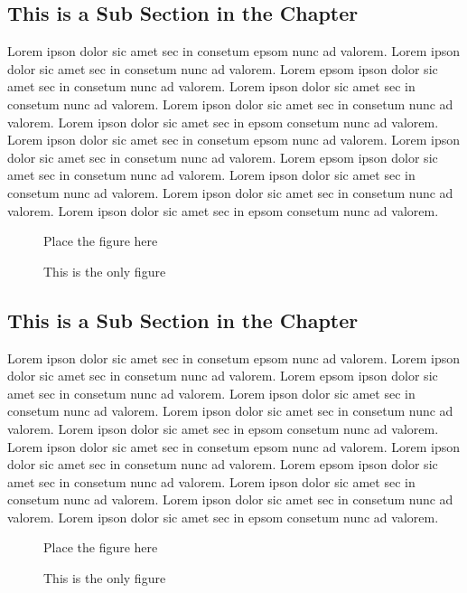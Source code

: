 \subsection{This is a Sub Section in the Chapter}
Lorem ipson dolor sic amet sec in consetum epsom nunc ad valorem. Lorem ipson dolor sic amet
sec in consetum nunc ad valorem. Lorem epsom ipson dolor sic amet sec in consetum nunc ad valorem. 
Lorem ipson dolor sic amet sec in consetum nunc ad valorem. Lorem ipson dolor sic amet
sec in consetum nunc ad valorem. Lorem ipson dolor sic amet sec in epsom consetum nunc ad valorem.
Lorem ipson dolor sic amet sec in consetum epsom nunc ad valorem. Lorem ipson dolor sic amet
sec in consetum nunc ad valorem. Lorem epsom ipson dolor sic amet sec in consetum nunc ad valorem. 
Lorem ipson dolor sic amet sec in consetum nunc ad valorem. Lorem ipson dolor sic amet
sec in consetum nunc ad valorem. Lorem ipson dolor sic amet sec in epsom consetum nunc ad valorem.
\begin{figure}
Place the figure here
\caption{This is the only figure}
\end{figure}

\subsection{This is a Sub Section in the Chapter}
Lorem ipson dolor sic amet sec in consetum epsom nunc ad valorem. Lorem ipson dolor sic amet
sec in consetum nunc ad valorem. Lorem epsom ipson dolor sic amet sec in consetum nunc ad valorem. 
Lorem ipson dolor sic amet sec in consetum nunc ad valorem. Lorem ipson dolor sic amet
sec in consetum nunc ad valorem. Lorem ipson dolor sic amet sec in epsom consetum nunc ad valorem.
Lorem ipson dolor sic amet sec in consetum epsom nunc ad valorem. Lorem ipson dolor sic amet
sec in consetum nunc ad valorem. Lorem epsom ipson dolor sic amet sec in consetum nunc ad valorem. 
Lorem ipson dolor sic amet sec in consetum nunc ad valorem. Lorem ipson dolor sic amet
sec in consetum nunc ad valorem. Lorem ipson dolor sic amet sec in epsom consetum nunc ad valorem.
\begin{figure}
Place the figure here
\caption{This is the only figure}
\end{figure}


